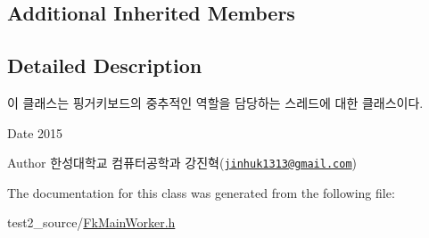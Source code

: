 \subsection*{Additional Inherited Members}


\subsection{Detailed Description}
이 클래스는 핑거키보드의 중추적인 역할을 담당하는 스레드에 대한 클래스이다. 

\begin{DoxyDate}{Date}
2015 
\end{DoxyDate}
\begin{DoxyAuthor}{Author}
한성대학교 컴퓨터공학과 강진혁(\href{mailto:jinhuk1313@gmail.com}{\tt jinhuk1313@gmail.\+com}) 
\end{DoxyAuthor}


The documentation for this class was generated from the following file\+:\begin{DoxyCompactItemize}
\item 
test2\+\_\+source/\hyperlink{_fk_main_worker_8h}{Fk\+Main\+Worker.\+h}\end{DoxyCompactItemize}
